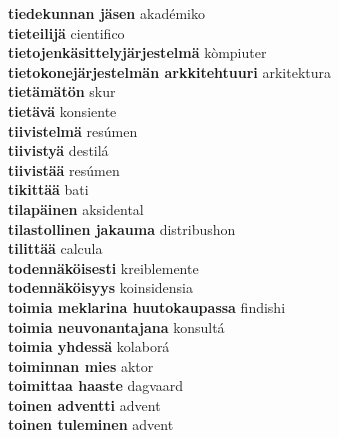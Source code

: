 \textbf{ tiedekunnan jäsen  } akadémiko \\
\textbf{ tieteilijä  } cientifico \\
\textbf{ tietojenkäsittelyjärjestelmä  } kòmpiuter \\
\textbf{ tietokonejärjestelmän arkkitehtuuri  } arkitektura \\
\textbf{ tietämätön  } skur \\
\textbf{ tietävä  } konsiente \\
\textbf{ tiivistelmä  } resúmen \\
\textbf{ tiivistyä  } destilá \\
\textbf{ tiivistää  } resúmen \\
\textbf{ tikittää  } bati \\
\textbf{ tilapäinen  } aksidental \\
\textbf{ tilastollinen jakauma  } distribushon \\
\textbf{ tilittää  } calcula \\
\textbf{ todennäköisesti  } kreiblemente \\
\textbf{ todennäköisyys  } koinsidensia \\
\textbf{ toimia meklarina huutokaupassa  } findishi \\
\textbf{ toimia neuvonantajana  } konsultá \\
\textbf{ toimia yhdessä  } kolaborá \\
\textbf{ toiminnan mies  } aktor \\
\textbf{ toimittaa haaste  } dagvaard \\
\textbf{ toinen adventti  } advent \\
\textbf{ toinen tuleminen  } advent \\
